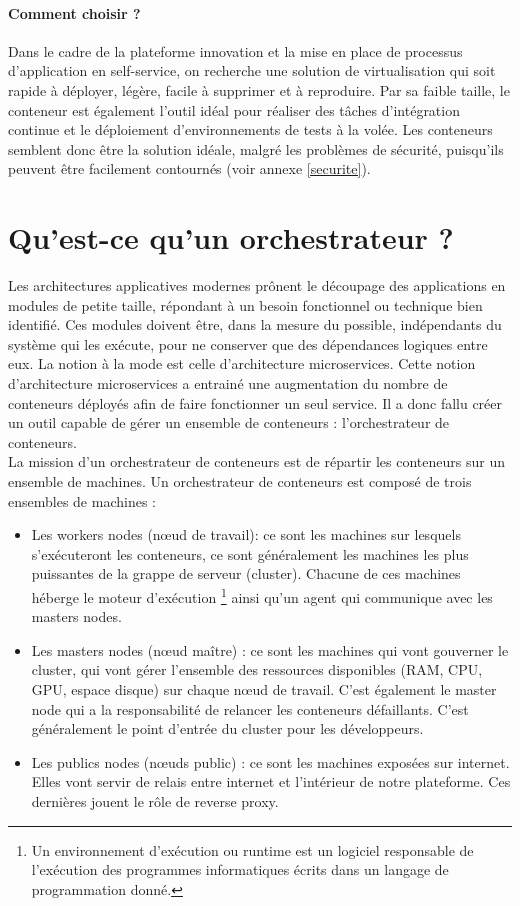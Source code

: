 \documentclass[11pt,fleqn]{book} %
\begin{document}
\begin{interrupt}
\paragraph{Comment choisir ?}
Dans le cadre de la plateforme innovation et la mise en place de processus d'application en self-service, on recherche une solution de virtualisation qui soit rapide à  déployer, légère, facile à supprimer et à reproduire. Par sa faible taille, le conteneur est également l'outil idéal pour réaliser des tâches d'intégration continue et le déploiement d'environnements de tests à la volée. Les conteneurs semblent donc être la solution idéale, malgré les problèmes de sécurité, puisqu'ils peuvent être facilement contournés (voir annexe \ref{securite}).
\end{interrupt}

\section{Qu'est-ce qu'un orchestrateur ? }
Les architectures applicatives modernes prônent le découpage des applications en modules de petite taille, répondant à un besoin fonctionnel ou technique bien identifié. Ces modules doivent être, dans la mesure du possible, indépendants du système qui les exécute, pour ne conserver que des dépendances logiques entre eux. La notion à la mode est celle d’architecture microservices. Cette notion d'architecture microservices a entrainé une augmentation du nombre de conteneurs déployés afin de faire fonctionner un seul service. Il a donc fallu créer un outil capable de gérer un ensemble de conteneurs : l'orchestrateur de conteneurs.\\ 

La mission d'un orchestrateur de conteneurs est de répartir les conteneurs sur un ensemble de machines. Un orchestrateur de conteneurs est composé de trois ensembles de machines :
\begin{itemize}
    \item Les workers nodes (nœud de travail): ce sont les machines sur lesquels s'exécuteront les conteneurs, ce sont généralement les machines les plus puissantes de la grappe de serveur (cluster). Chacune de ces machines héberge le moteur d'exécution \footnote{Un environnement d'exécution ou runtime est un logiciel responsable de l'exécution des programmes informatiques écrits dans un langage de programmation donné.} ainsi qu'un agent qui communique avec les masters nodes.
    \item Les masters nodes (nœud maître) : ce sont les machines qui vont gouverner le cluster, qui vont gérer l'ensemble des ressources disponibles (RAM, CPU, GPU, espace disque) sur chaque nœud de travail. C'est également le master node qui a la responsabilité de relancer les conteneurs défaillants. C'est généralement le point d'entrée du cluster pour les développeurs.
    \item Les publics nodes (nœuds public) :  ce sont les machines exposées sur internet. Elles vont servir de relais entre internet et l'intérieur de notre plateforme. Ces dernières jouent le rôle de reverse proxy.\\
\end{itemize}
 
\end{document}

